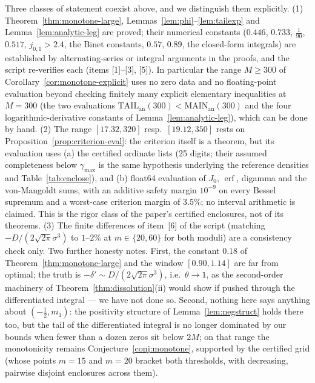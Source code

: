 \begin{remark}
\label{rem:monotone-rigor}
Three classes of statement coexist above, and we distinguish them
explicitly. (1) Theorem~\ref{thm:monotone-large},
Lemmas~\ref{lem:phi}--\ref{lem:tailexp} and
Lemma~\ref{lem:analytic-leg} are proved; their numerical constants
($0.446$, $0.733$, $\tfrac1{90}$, $0.517$, $j_{0,1}>2.4$, the Binet
constants, $0.57$, $0.89$, the closed-form integrals) are established
by alternating-series or integral arguments in the proofs, and the
script re-verifies each (items [1]--[3], [5]). In particular the
range $M\ge300$ of Corollary~\ref{cor:monotone-explicit} uses no zero
data and no floating-point evaluation beyond checking finitely many
explicit elementary inequalities at $M=300$ (the two evaluations
$\mathrm{TAIL}_{\mathrm{an}}(300)<\mathrm{MAIN}_{\mathrm{an}}(300)$
and the four logarithmic-derivative constants of
Lemma~\ref{lem:analytic-leg}), which can be done by hand.
(2) The range $[17.32,320]$ resp.\ $[19.12,350]$ rests on
Proposition~\ref{prop:criterion-eval}: the criterion itself is a
theorem, but its evaluation uses (a) the certified ordinate lists
(25 digits; their assumed completeness below $\gamma_{\max}$ is the
same hypothesis underlying the reference densities and
Table~\ref{tab:enclose}), and (b) float64 evaluation of $J_0$,
$\operatorname{erf}$, digamma and the von-Mangoldt sums, with an
additive safety margin $10^{-9}$ on every Bessel supremum and a
worst-case criterion margin of $3.5\%$; no interval arithmetic is
claimed. This is the rigor class of the paper's certified enclosures,
not of its theorems. (3) The finite differences of item~[6] of the
script (matching $-D/(2\sqrt{2\pi}\sigma^3)$ to $1$--$2\%$ at
$m\in\{20,60\}$ for both moduli) are a consistency check only.
Two further honesty notes. First, the constant $0.18$ of
Theorem~\ref{thm:monotone-large} and the window $[0.90,1.14]$ are
far from optimal; the truth is
$-\delta'\sim D/(2\sqrt{2\pi}\sigma^3)$, i.e.\ $\theta\to1$, as the
second-order machinery of Theorem~\ref{thm:dissolution}(ii) would
show if pushed through the differentiated integral --- we have not
done so. Second, nothing here says anything about
$(-\tfrac12,m_1)$: the positivity structure of
Lemma~\ref{lem:negstruct} holds there too, but the tail of the
differentiated integral is no longer dominated by our bounds when
fewer than a dozen zeros sit below $2M$; on that range the
monotonicity remains Conjecture~\ref{conj:monotone}, supported by the
certified grid (whose points $m=15$ and $m=20$ bracket both
thresholds, with decreasing, pairwise disjoint enclosures across
them).
\end{remark}

